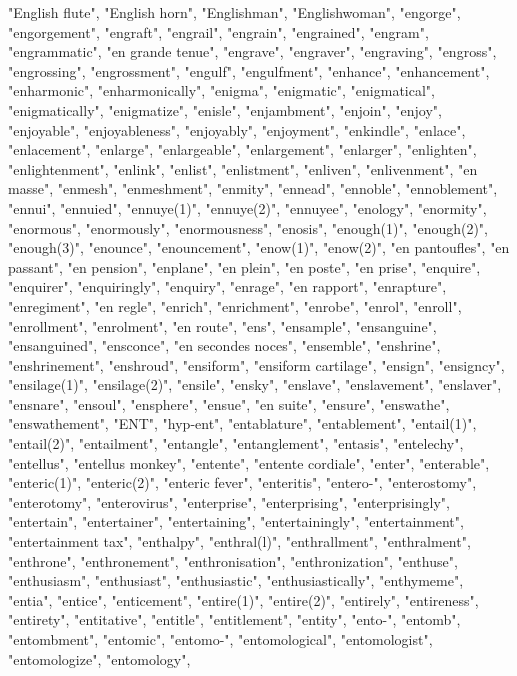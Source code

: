 "English flute",
"English horn",
"Englishman",
"Englishwoman",
"engorge",
"engorgement",
"engraft",
"engrail",
"engrain",
"engrained",
"engram",
"engrammatic",
"en grande tenue",
"engrave",
"engraver",
"engraving",
"engross",
"engrossing",
"engrossment",
"engulf",
"engulfment",
"enhance",
"enhancement",
"enharmonic",
"enharmonically",
"enigma",
"enigmatic",
"enigmatical",
"enigmatically",
"enigmatize",
"enisle",
"enjambment",
"enjoin",
"enjoy",
"enjoyable",
"enjoyableness",
"enjoyably",
"enjoyment",
"enkindle",
"enlace",
"enlacement",
"enlarge",
"enlargeable",
"enlargement",
"enlarger",
"enlighten",
"enlightenment",
"enlink",
"enlist",
"enlistment",
"enliven",
"enlivenment",
"en masse",
"enmesh",
"enmeshment",
"enmity",
"ennead",
"ennoble",
"ennoblement",
"ennui",
"ennuied",
"ennuye(1)",
"ennuye(2)",
"ennuyee",
"enology",
"enormity",
"enormous",
"enormously",
"enormousness",
"enosis",
"enough(1)",
"enough(2)",
"enough(3)",
"enounce",
"enouncement",
"enow(1)",
"enow(2)",
"en pantoufles",
"en passant",
"en pension",
"enplane",
"en plein",
"en poste",
"en prise",
"enquire",
"enquirer",
"enquiringly",
"enquiry",
"enrage",
"en rapport",
"enrapture",
"enregiment",
"en regle",
"enrich",
"enrichment",
"enrobe",
"enrol",
"enroll",
"enrollment",
"enrolment",
"en route",
"ens",
"ensample",
"ensanguine",
"ensanguined",
"ensconce",
"en secondes noces",
"ensemble",
"enshrine",
"enshrinement",
"enshroud",
"ensiform",
"ensiform cartilage",
"ensign",
"ensigncy",
"ensilage(1)",
"ensilage(2)",
"ensile",
"ensky",
"enslave",
"enslavement",
"enslaver",
"ensnare",
"ensoul",
"ensphere",
"ensue",
"en suite",
"ensure",
"enswathe",
"enswathement",
"ENT",
"hyp-ent",
"entablature",
"entablement",
"entail(1)",
"entail(2)",
"entailment",
"entangle",
"entanglement",
"entasis",
"entelechy",
"entellus",
"entellus monkey",
"entente",
"entente cordiale",
"enter",
"enterable",
"enteric(1)",
"enteric(2)",
"enteric fever",
"enteritis",
"entero-",
"enterostomy",
"enterotomy",
"enterovirus",
"enterprise",
"enterprising",
"enterprisingly",
"entertain",
"entertainer",
"entertaining",
"entertainingly",
"entertainment",
"entertainment tax",
"enthalpy",
"enthral(l)",
"enthrallment",
"enthralment",
"enthrone",
"enthronement",
"enthronisation",
"enthronization",
"enthuse",
"enthusiasm",
"enthusiast",
"enthusiastic",
"enthusiastically",
"enthymeme",
"entia",
"entice",
"enticement",
"entire(1)",
"entire(2)",
"entirely",
"entireness",
"entirety",
"entitative",
"entitle",
"entitlement",
"entity",
"ento-",
"entomb",
"entombment",
"entomic",
"entomo-",
"entomological",
"entomologist",
"entomologize",
"entomology",
